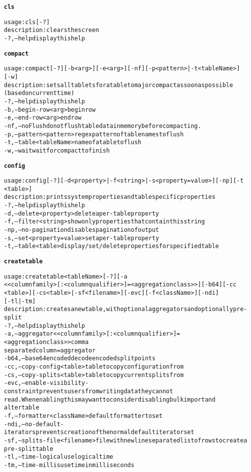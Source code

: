 \begin{alltt}
\textbf{cls}

    usage: cls [-?]
    description: clears the screen
      -?,--help  display this help

\textbf{compact}

    usage: compact [-?] [-b <arg>] [-e <arg>] [-nf] [-p <pattern> | -t <tableName>] 
              [-w]
    description: sets all tablets for a table to major compact as soon as possible
              (based on current time)
      -?,--help  display this help
      -b,--begin-row <arg>  begin row
      -e,--end-row <arg>  end row
      -nf,--noFlush  do not flush table data in memory before compacting.
      -p,--pattern <pattern>  regex pattern of table names to flush
      -t,--table <tableName>  name of a table to flush
      -w,--wait  wait for compact to finish

\textbf{config}

    usage: config [-?] [-d <property> | -f <string> | -s <property=value>]  [-np]  [-t
              <table>]
    description: prints system properties and table specific properties
      -?,--help  display this help
      -d,--delete <property>  delete a per-table property
      -f,--filter <string>  show only properties that contain this string
      -np,--no-pagination  disables pagination of output
      -s,--set <property=value>  set a per-table property
      -t,--table <table>  display/set/delete properties for specified table

\textbf{createtable}

    usage: createtable <tableName> [-?] [-a
              <{<columnfamily>[:<columnqualifier>]=<aggregation class>}>] [-b64] [-cc
              <table>] [-cs <table> | -sf <filename>] [-evc] [-f <className>] [-ndi] 
              [-tl | -tm]
    description: creates a new table, with optional aggregators and optionally pre-split
      -?,--help  display this help
      -a,--aggregator <{<columnfamily>[:<columnqualifier>]=<aggregation class>}>  comma
              separated column=aggregator
      -b64,--base64encoded  decode encoded split points
      -cc,--copy-config <table>  table to copy configuration from
      -cs,--copy-splits <table>  table to copy current splits from
      -evc,--enable-visibility-constraint  prevents users from writing data they can not
              read.  When enabling this may want to consider disabling bulk import and
              alter table
      -f,--formatter <className>  default formatter to set
      -ndi,--no-default-iterators  prevents creation of the normal default iterator set
      -sf,--splits-file <filename>  file with newline separated list of rows to create a
              pre-split table
      -tl,--time-logical  use logical time
      -tm,--time-millis  use time in milliseconds


\end{alltt}
